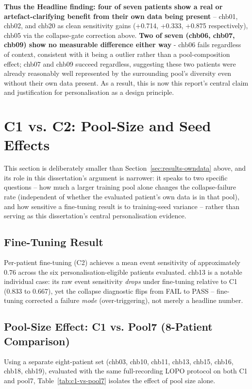\textbf{Thus the Headline finding: four of seven patients show a real or artefact-clarifying benefit from their own data being present} -- chb01, chb02, and chb20 as clean sensitivity gains (+0.714, +0.333, +0.875 respectively), chb05 via the collapse-gate correction above. \textbf{Two of seven (chb06, chb07, chb09) show no measurable difference either way} - chb06 fails regardless of context, consistent with it being a outlier rather than a pool-composition effect; chb07 and chb09 succeed regardless, 
suggesting these two patients were already reasonably well represented by the surrounding pool's diversity even without their own data present. As a result, this is now this report's central claim and justification for personalisation as a design principle.

\section{C1 vs. C2: Pool-Size and Seed Effects}
\label{sec:results-c2}

This section is deliberately smaller than Section~\ref{sec:results-owndata} above, and its role in this dissertation's argument is narrower: it speaks to two specific questions -- how much a larger training pool alone changes the collapse-failure rate (independent of whether the evaluated patient's own data is in that pool), and how sensitive a fine-tuning result is to training-seed variance -- rather than serving as this dissertation's central personalisation evidence.

\subsection{Fine-Tuning Result}

Per-patient fine-tuning (C2) achieves a mean event sensitivity of approximately 0.76 across the six personalisation-eligible patients evaluated. chb13 is a notable individual case: its raw event sensitivity \emph{drops} under fine-tuning relative to C1 (0.833 to 0.667), yet the collapse diagnostic flips from FAIL to PASS -- fine-tuning corrected a failure \emph{mode} (over-triggering), not merely a headline number.

\subsection{Pool-Size Effect: C1 vs. Pool7 (8-Patient Comparison)}

Using a separate eight-patient set (chb03, chb10, chb11, chb13, chb15, chb16, chb18, chb19), evaluated with the same full-recording LOPO protocol on both C1 and pool7, Table~\ref{tab:c1-vs-pool7} isolates the effect of pool size alone.

